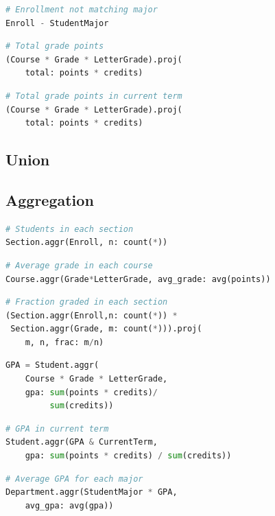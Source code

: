 \documentclass[letter,10pt]{article}
\begin{document}
\begin{lstlisting}[language=Python]
# Enrollment not matching major 
Enroll - StudentMajor 
\end{lstlisting}

\begin{lstlisting}[language=Python]
# Total grade points
(Course * Grade * LetterGrade).proj(
    total: points * credits)
\end{lstlisting}

\begin{lstlisting}[language=Python]
# Total grade points in current term
(Course * Grade * LetterGrade).proj(
    total: points * credits) 
\end{lstlisting}

\subsection{Union}
\subsection{Aggregation}
\begin{lstlisting}[language=Python]
# Students in each section
Section.aggr(Enroll, n: count(*))
\end{lstlisting}

\begin{lstlisting}[language=Python]
# Average grade in each course
Course.aggr(Grade*LetterGrade, avg_grade: avg(points))
\end{lstlisting}

\begin{lstlisting}[language=Python]
# Fraction graded in each section
(Section.aggr(Enroll,n: count(*)) * 
 Section.aggr(Grade, m: count(*))).proj(
    m, n, frac: m/n)
\end{lstlisting}

\begin{lstlisting}[language=Python]
GPA = Student.aggr(
    Course * Grade * LetterGrade,
    gpa: sum(points * credits)/
         sum(credits))
\end{lstlisting}

\begin{lstlisting}[language=Python]
# GPA in current term
Student.aggr(GPA & CurrentTerm, 
    gpa: sum(points * credits) / sum(credits))
\end{lstlisting}

\begin{lstlisting}[language=Python]
# Average GPA for each major
Department.aggr(StudentMajor * GPA, 
    avg_gpa: avg(gpa))
\end{lstlisting}
\end{document}
